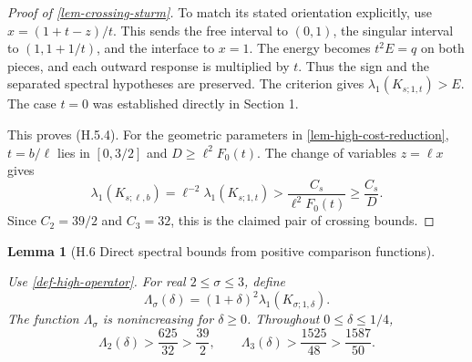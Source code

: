 \documentclass[11pt,a4paper]{article}
\theoremstyle{proofmanuscript}
\newtheorem{lemma}[theorem]{Lemma}
\begin{document}
\begin{proof}[Proof of \ref{lem-crossing-sturm}]
To match its stated orientation explicitly, use \(x=(1+t-z)/t\). This sends the free interval to \((0,1)\), the singular interval to \((1,1+1/t)\), and the interface to \(x=1\). The energy becomes \(t^2E=q\) on both pieces, and each outward response is multiplied by \(t\). Thus the sign and the separated spectral hypotheses are preserved. The criterion gives \(\lambda_1(K_{s;1,t})>E\). The case \(t=0\) was established directly in Section 1.

This proves (H.5.4). For the geometric parameters in \ref{lem-high-cost-reduction}, \(t=b/\ell\) lies in \([0,3/2]\) and \(D\ge\ell^2F_0(t)\). The change of variables \(z=\ell x\) gives \[
\lambda_1(K_{s;\ell,b})
=\ell^{-2}\lambda_1(K_{s;1,t})
>\frac{C_s}{\ell^2F_0(t)}
\ge\frac{C_s}{D}.
\] Since \(C_2=39/2\) and \(C_3=32\), this is the claimed pair of crossing bounds.

\end{proof}

\begin{lemma}[H.6 Direct spectral bounds from positive comparison functions]\label{lem-no-crossing-sturm}

Use \ref{def-high-operator}. For real \(2\le\sigma\le3\), define \[
\Lambda_\sigma(\delta)=(1+\delta)^2\lambda_1(K_{\sigma;1,\delta}).
\] The function \(\Lambda_\sigma\) is nonincreasing for \(\delta\ge0\). Throughout \(0\le\delta\le1/4\), \[
\Lambda_2(\delta)>\frac{625}{32}>\frac{39}{2},\qquad
\Lambda_3(\delta)>\frac{1525}{48}>\frac{1587}{50}.
\tag{H.6.1}
\]

\end{lemma}
\end{document}
